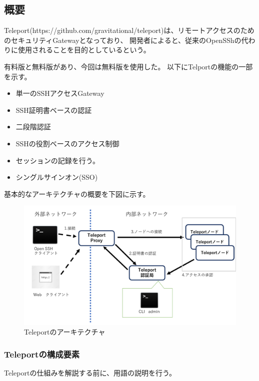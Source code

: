 \documentclass[11pt,a4j,titlepage]{jreport}
\begin{document}
\subsection*{概要}
Teleport(https://github.com/gravitational/teleport)は、リモートアクセスのためのセキュリティGatewayとなっており、
開発者によると、従来のOpenSShの代わりに使用されることを目的としているという。

有料版と無料版があり、今回は無料版を使用した。
以下にTelportの機能の一部を示す。

\begin{itemize}
    \setlength{\parskip}{0.1cm} %
    \setlength{\itemsep}{0.1cm}
    \item 単一のSSHアクセスGateway
    \item SSH証明書ベースの認証
    \item 二段階認証
    \item SSHの役割ベースのアクセス制御
    \item セッションの記録を行う。
    \item シングルサインオン(SSO)
\end{itemize}

基本的なアーキテクチャの概要を下図に示す。
\begin{figure}[H]
    \centering
    \includegraphics*[width=1.0\textwidth,page=1]{graphs/teleport_archtecture.pdf}
    \caption{Teleportのアーキテクチャ}
    \label{teleport_archtecture}
\end{figure}


\subsubsection*{Teleportの構成要素}
Teleportの仕組みを解説する前に、用語の説明を行う。
\end{document}
